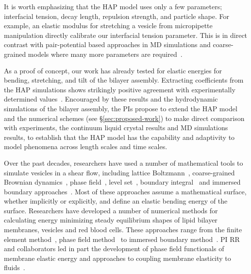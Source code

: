 It is worth emphasizing that the HAP model uses only a few parameters;
interfacial tension, decay length, repulsion strength, and particle
shape. For example, an elastic modulus for stretching a vesicle from
micropipette manipulation directly calibrate our interfacial tension
parameter. This is in direct contrast with pair-potential based
approaches in MD simulations and coarse-grained models where many more
parameters are required~\cite{Varilly2011, Wang2013}.

As a proof of concept, our work has already tested for elastic energies
for bending, stretching, and tilt of the bilayer assembly. Extracting
coefficients from the HAP simulations shows strikingly positive
agreement with experimentally determined values~\cite{Fu2018_SIAM}.
Encouraged by these results and the hydrodynamic simulations of the
bilayer assembly, the PIs propose to extend the HAP model and the
numerical schemes (see \S\ref{sec:proposed-work}) to make direct
comparison with experiments, the continuum liquid crystal results and MD
simulations results, to establish that the HAP model has the capability
and adaptivity to model phenomena across length scales and time scales.

Over the past decades, researchers have used a number of mathematical
tools to simulate vesicles in a shear flow, including lattice
Boltzmann~\cite{KaouiHartingMisbah2011_PRE}, coarse-grained Brownian
dynamics~\cite{NoguchiTakasu2002_BJ}, phase
field~\cite{DuLiuWang2004_JCP,BibenKassnerMisbah2005_PRE}, level
set~\cite{DoyeuxGuyotChabannesEtAl2013_JCAM}, boundary
integral~\cite{Shravan09,Rahimian15} and immersed boundary
approaches~\cite{KimLai2010_JCP,KimLai2012_PRE,HuLaiSeolEtAl2016_JCP}.
Most of these approaches assume a mathematical surface, whether
implicitly or explicitly, and define an elastic bending energy of the
surface. Researchers have developed a number of numerical methods for
calculating energy minimizing steady equilibrium shapes of lipid bilayer
membranes, vesicles and red blood cells. These approaches range from the
finite element method~\cite{Bartels,Peng13,RyKlYaCo16,Sinha15}, phase
field method~\cite{Du05,QiangDu08,Lowengrub13} to immersed boundary
method~\cite{Hu,Hu13, KimLai2010_JCP}. PI RR and collaborators led in
part the development of phase field functionals of membrane elastic
energy and approaches to coupling membrane elasticity to
fluids~\cite{0951-7715-18-3-016,Du05,DuEuler,QiangDu09}.


